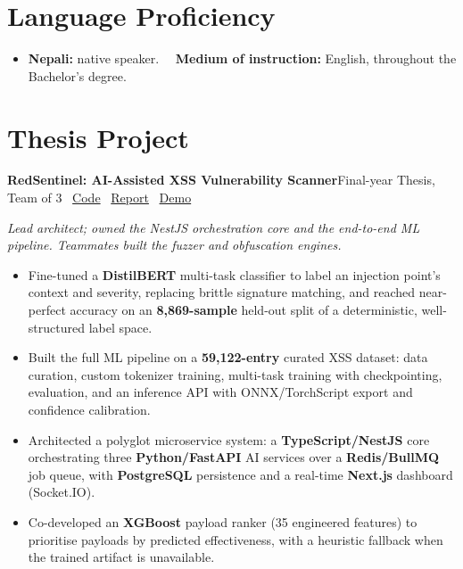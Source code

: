\documentclass[a4paper,10pt]{article}
\newcommand{\entry}[2]{\textbf{#1}\hfill{\color{rulegray}\small #2}\par\vspace{1pt}}
\begin{document}
\section*{Language Proficiency}

\begin{itemize}
\item \textbf{Nepali:} native speaker. \ \ \textbf{Medium of instruction:} English, throughout the Bachelor's degree.
\end{itemize}

\section*{Thesis Project}

\entry{RedSentinel: AI-Assisted XSS Vulnerability Scanner}{Final-year Thesis, Team of 3 \textbar\ \href{https://github.com/seamoonpandey/Xbow}{Code} \textbar\ \href{https://github.com/seamoonpandey/Xbow-report}{Report} \textbar\ \href{https://drive.google.com/file/d/1HZmdURP3l8JNoTyL40me_O1-8kat4Q9d/view?usp=sharing}{Demo}}
\textit{Lead architect; owned the NestJS orchestration core and the end-to-end ML pipeline. Teammates built the fuzzer and obfuscation engines.}
\begin{itemize}
\item Fine-tuned a \textbf{DistilBERT} multi-task classifier to label an injection point's context and severity, replacing brittle signature matching, and reached near-perfect accuracy on an \textbf{8,869-sample} held-out split of a deterministic, well-structured label space.
\item Built the full ML pipeline on a \textbf{59,122-entry} curated XSS dataset: data curation, custom tokenizer training, multi-task training with checkpointing, evaluation, and an inference API with ONNX/TorchScript export and confidence calibration.
\item Architected a polyglot microservice system: a \textbf{TypeScript/NestJS} core orchestrating three \textbf{Python/FastAPI} AI services over a \textbf{Redis/BullMQ} job queue, with \textbf{PostgreSQL} persistence and a real-time \textbf{Next.js} dashboard (Socket.IO).
\item Co-developed an \textbf{XGBoost} payload ranker (35 engineered features) to prioritise payloads by predicted effectiveness, with a heuristic fallback when the trained artifact is unavailable.
\end{itemize}
\end{document}
